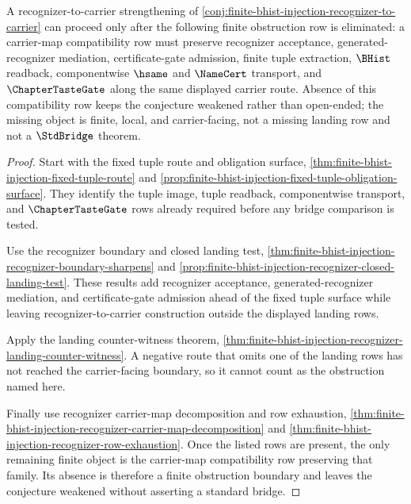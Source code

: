 \begin{theorem}
\label{thm:finite-bhist-injection-recognizer-map-obstruction}
A recognizer-to-carrier strengthening of \autoref{conj:finite-bhist-injection-recognizer-to-carrier} can proceed only after the following finite obstruction row is eliminated: a carrier-map compatibility row must preserve recognizer acceptance, generated-recognizer mediation, certificate-gate admission, finite tuple extraction, $\BHist$ readback, componentwise $\hsame$ and $\NameCert$ transport, and $\ChapterTasteGate$ along the same displayed carrier route. Absence of this compatibility row keeps the conjecture weakened rather than open-ended; the missing object is finite, local, and carrier-facing, not a missing landing row and not a $\StdBridge$ theorem.
\end{theorem}
\begin{proof}
Start with the fixed tuple route and obligation surface, \autoref{thm:finite-bhist-injection-fixed-tuple-route} and \autoref{prop:finite-bhist-injection-fixed-tuple-obligation-surface}. They identify the tuple image, tuple readback, componentwise transport, and $\ChapterTasteGate$ rows already required before any bridge comparison is tested.

Use the recognizer boundary and closed landing test, \autoref{thm:finite-bhist-injection-recognizer-boundary-sharpens} and \autoref{prop:finite-bhist-injection-recognizer-closed-landing-test}. These results add recognizer acceptance, generated-recognizer mediation, and certificate-gate admission ahead of the fixed tuple surface while leaving recognizer-to-carrier construction outside the displayed landing rows.

Apply the landing counter-witness theorem, \autoref{thm:finite-bhist-injection-recognizer-landing-counter-witness}. A negative route that omits one of the landing rows has not reached the carrier-facing boundary, so it cannot count as the obstruction named here.

Finally use recognizer carrier-map decomposition and row exhaustion, \autoref{thm:finite-bhist-injection-recognizer-carrier-map-decomposition} and \autoref{thm:finite-bhist-injection-recognizer-row-exhaustion}. Once the listed rows are present, the only remaining finite object is the carrier-map compatibility row preserving that family. Its absence is therefore a finite obstruction boundary and leaves the conjecture weakened without asserting a standard bridge.
\end{proof}

